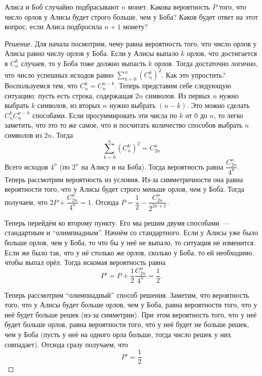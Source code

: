 \documentclass[a4paper,12pt]{article}
\begin{document}
\begin{problem}
	Алиса и Боб случайно подбрасывают \(n\) монет. Какова вероятность \(P\) того, что число орлов у Алисы будет строго больше, чем у Боба? Каков будет ответ на этот вопрос, если Алиса подбросила \(n + 1\) монету?
\end{problem}
\begin{proof}[Решение]
	Для начала посмотрим, чему равна вероятность того, что число орлов у Алисы равно числу орлов у Боба.
	Если у Алисы выпало \(k\) орлов, что достигается в \(C_{n}^{k}\) случаев, то у Боба тоже должно выпасть \(k\) орлов. Тогда достаточно логично, что число успешных исходов равно \(\sum\limits_{k = 0}^{n} \left(C_{n}^{k}\right)^2\). Как это упростить? Воспользуемся тем, что \(C_{n}^{k} = C_{n}^{n - k}\). Теперь представим себе следующую ситуацию: пусть есть строка, содержащая \(2n\) символов. Из первых \(n\) нужно выбрать \(k\) символов, из вторых \(n\) нужно выбрать \((n - k)\). Это можно сделать \(C_{n}^{k}C_{n}^{n - k}\) способами. Если просуммировать эти числа по \(k\) от 0 до \(n\), то легко заметить, что это то же самое, что и посчитать количество способов выбрать \(n\) символов из \(2n\). Тогда \[\sum\limits_{k = 0}^{n} \left(C_{n}^{k}\right)^2 = C_{2n}^{n}\]
	Всего исходов \(4^n\) (по \(2^n\) на Алису и на Боба). Тогда вероятность равна \(\dfrac{C_{2n}^{n}}{4^n}\).
	Теперь рассмотрим вероятность из условия. Из-за симметричности она равна вероятности того, что у Алисы будет строго меньше орлов, чем у Боба. Тогда получаем, что \(2P + \dfrac{C_{2n}^{n}}{4^n} = 1\). Отсюда \(P = \dfrac{1}{2} - \dfrac{C_{2n}^{n}}{2^{2n + 1}}\).
	
	Теперь перейдём ко второму пункту. Его мы решим двумя способами~--- стандартным и ``олимпиадным''. Начнём со стандартного. Если у Алисы уже было больше орлов, чем у Боба, то что бы у неё не выпало, то ситуация не изменится. Если же было так, что у нё столько же орлов, сколько у Боба, то ей необходимо, чтобы выпал орёл. Тогда искомая вероятность равна \[P' = P + \dfrac{1}{2}\dfrac{C_{2n}^{n}}{4^n} = \dfrac{1}{2}.\]
	
	Теперь рассмотрим ``олимпиадный'' способ решения. Заметим, что вероятность того, что у Алисы будет больше орлов, чем у Боба, равна вероятности того, что у неё будет больше решек (из-за симметрии). При этом вероятность того, что у неё будет больше орлов, равна вероятности того, что у неё будет не больше решек, чем у Боба (пусть у неё на одного орла больше, тогда число решек у них совпадает). Отсюда сразу получаем, что \[P' = \frac{1}{2}\]
\end{proof}
\end{document}
